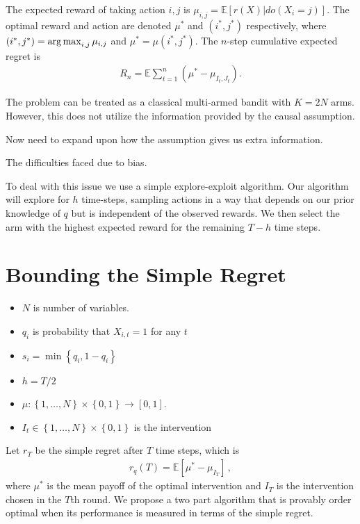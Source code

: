\documentclass{article}
\newcommand{\E}{\mathbb E}
\newcommand{\set}[1]{\left\{#1\right\}}
\newcommand{\argmax}{\operatornamewithlimits{arg\,max}}
\newcommand{\eq}[1]{\begin{align*}#1\end{align*}}
\theoremstyle{plain}
\theoremstyle{definition}
\begin{document}
The expected reward of taking action $i,j$ is $\mu_{i,j} = \E[r(X)|do(X_i = j)]$. The optimal reward and action are denoted $\mu^*$ and $(i^*,j^*)$ respectively,
where $(i^*,j^*) = \argmax_{i,j} \mu_{i,j}$ and $\mu^* = \mu(i^*,j^*)$. The $n$-step cumulative expected regret is
\eq{
R_n = \E \sum_{t=1}^n \left(\mu^* - \mu_{I_t,J_t}\right).
}

The problem can be treated as a classical multi-armed bandit with $K = 2N$ arms. However, this does not utilize the information provided by the causal assumption. 

Now need to expand upon how the assumption gives us extra information. 

The difficulties faced due to bias.

To deal with this issue we use a simple explore-exploit algorithm. Our algorithm will explore for $h$ time-steps, sampling actions in a way that depends on our prior knowledge of $q$ but is independent of the observed rewards. We then select the arm with the highest expected reward for the remaining $T-h$ time steps. 

\section{Bounding the Simple Regret}

\begin{itemize}
\item $N$ is number of variables.
\item $q_i$ is probability that $X_{i,t} = 1$ for any $t$
\item $s_i = \min\set{q_i, 1 - q_i}$
\item $h = T/2$
\item $\mu : \set{1,\ldots,N} \times \set{0,1} \to [0,1]$.
\item $I_t \in \set{1,\ldots,N} \times \set{0,1}$ is the intervention
\end{itemize}

Let $r_T$ be the simple regret after $T$ time steps, which is
\eq{
r_q(T) = \E\left[\mu^* - \mu_{I_T}\right]\,,
}
where $\mu^*$ is the mean payoff of the optimal intervention and $I_T$ is the intervention chosen in the $T$th round.
We propose a two part algorithm that is provably order optimal when its performance is measured in terms of the simple regret.
\end{document}
